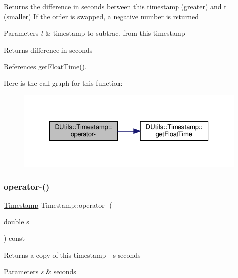 Returns the difference in seconds between this timestamp (greater) and t (smaller) If the order is swapped, a negative number is returned 
\begin{DoxyParams}{Parameters}
{\em t} & timestamp to subtract from this timestamp \\
\hline
\end{DoxyParams}
\begin{DoxyReturn}{Returns}
difference in seconds 
\end{DoxyReturn}


References get\+Float\+Time().

Here is the call graph for this function\+:\nopagebreak
\begin{figure}[H]
\begin{center}
\leavevmode
\includegraphics[width=326pt]{classDUtils_1_1Timestamp_ac7f07414867eaa6bea6acd7b41e9f60c_cgraph}
\end{center}
\end{figure}
\mbox{\label{classDUtils_1_1Timestamp_adfccd22d119468b931e7144ceb9d08da}} 
\subsubsection{\texorpdfstring{operator-\/()}{operator-()}\hspace{0.1cm}{\footnotesize\ttfamily [2/2]}}
{\footnotesize\ttfamily \hyperlink{classDUtils_1_1Timestamp}{Timestamp} Timestamp\+::operator-\/ (\begin{DoxyParamCaption}\item[{double}]{s }\end{DoxyParamCaption}) const}

Returns a copy of this timestamp -\/ s seconds 
\begin{DoxyParams}{Parameters}
{\em s} & seconds \\
\hline
\end{DoxyParams}
\mbox{\label{classDUtils_1_1Timestamp_a775ece4a7fab156430da57da985a8965}} 
